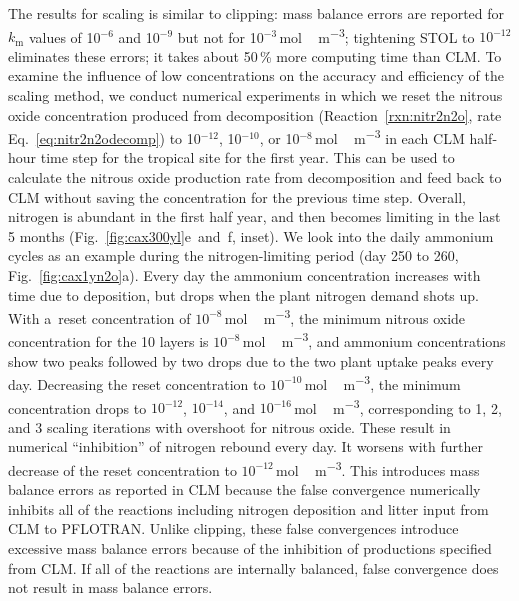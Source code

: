 \documentclass[gmd,noline]{copernicus}
\begin{document}
      The results for scaling is similar to clipping: mass balance errors
      are reported for $k_\mathrm{m}$ values of 10$^{-6}$ and 10$^{-9}$ but
      not for 10$^{-3}$\,\unit{mol\,m^{-3}}; tightening STOL to $10^{-12}$
      eliminates these errors; it takes about 50\,{\%} more computing time
      than CLM. To examine the influence of low concentrations on the
      accuracy and efficiency of the scaling method, we conduct numerical
      experiments in which we reset the nitrous oxide concentration produced
      from decomposition (Reaction~\ref{rxn:nitr2n2o}, rate
      Eq.~\ref{eq:nitr2n2odecomp}) to 10$^{-12}$, 10$^{-10}$, or
      10$^{-8}$\,\unit{mol\,m^{-3}} in each CLM half-hour time step for the
      tropical site for the first year. This can be used to calculate the
      nitrous oxide production rate from decomposition and feed back to CLM
      without saving the concentration for the previous time step. Overall,
      nitrogen is abundant in the first half year, and then becomes limiting
      in the last 5 months (Fig.~\ref{fig:cax300yl}e~and~f, inset). We
      look into the daily ammonium cycles as an example during the nitrogen-limiting period (day 250 to 260, Fig.~\ref{fig:cax1yn2o}a). Every day
      the ammonium concentration increases with time due to deposition, but
      drops when the plant nitrogen demand shots up. With a~reset
      concentration of $10^{-8}$\,\unit{mol\,m^{-3}}, the minimum nitrous
      oxide concentration for the 10 layers is
      $10^{-8}$\,\unit{mol\,m^{-3}}, and ammonium concentrations show two
      peaks followed by two drops due to the two plant uptake peaks every
      day. Decreasing the reset concentration to
      $10^{-10}$\,\unit{mol\,m^{-3}}, the minimum concentration drops to
      $10^{-12}$, $10^{-14}$, and $10^{-16}$\,\unit{mol\,m^{-3}},
      corresponding to 1, 2, and 3 scaling iterations with overshoot for
      nitrous oxide. These result in numerical ``inhibition'' of nitrogen
      rebound every day. It worsens with further decrease of the reset
      concentration to $10^{-12}$\,\unit{mol\,m^{-3}}. This introduces mass
      balance errors as reported in CLM because the false convergence
      numerically inhibits all of the reactions including nitrogen
      deposition and litter input from CLM to PFLOTRAN.  Unlike clipping,
      these false convergences introduce excessive mass balance errors
      because of the inhibition of productions specified from CLM. If all of
      the reactions are internally balanced, false convergence does not
      result in mass balance errors.
\end{document}
